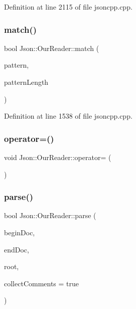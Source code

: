 Definition at line 2115 of file jsoncpp.\+cpp.

\hypertarget{class_json_1_1_our_reader_a4a03f1b266def9b47c4fef35386557fb}{}\label{class_json_1_1_our_reader_a4a03f1b266def9b47c4fef35386557fb} 
\subsubsection{\texorpdfstring{match()}{match()}}
{\footnotesize\ttfamily bool Json\+::\+Our\+Reader\+::match (\begin{DoxyParamCaption}\item[{\hyperlink{class_json_1_1_our_reader_a1bdc7bbc52ba87cae6b19746f2ee0189}{Location}}]{pattern,  }\item[{int}]{pattern\+Length }\end{DoxyParamCaption})\hspace{0.3cm}{\ttfamily [private]}}



Definition at line 1538 of file jsoncpp.\+cpp.

\hypertarget{class_json_1_1_our_reader_ad418de7c47bd3d0510888e22110b796e}{}\label{class_json_1_1_our_reader_ad418de7c47bd3d0510888e22110b796e} 
\subsubsection{\texorpdfstring{operator=()}{operator=()}}
{\footnotesize\ttfamily void Json\+::\+Our\+Reader\+::operator= (\begin{DoxyParamCaption}\item[{\hyperlink{class_json_1_1_our_reader}{Our\+Reader} const \&}]{ }\end{DoxyParamCaption})\hspace{0.3cm}{\ttfamily [private]}}

\hypertarget{class_json_1_1_our_reader_aba4f8749aab7f02ec17f107e392caf80}{}\label{class_json_1_1_our_reader_aba4f8749aab7f02ec17f107e392caf80} 
\subsubsection{\texorpdfstring{parse()}{parse()}}
{\footnotesize\ttfamily bool Json\+::\+Our\+Reader\+::parse (\begin{DoxyParamCaption}\item[{const char $\ast$}]{begin\+Doc,  }\item[{const char $\ast$}]{end\+Doc,  }\item[{\hyperlink{class_json_1_1_value}{Value} \&}]{root,  }\item[{bool}]{collect\+Comments = {\ttfamily true} }\end{DoxyParamCaption})}



